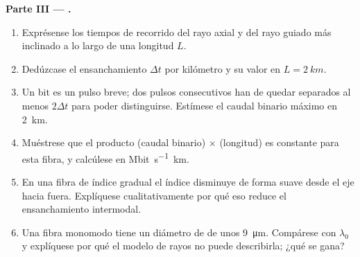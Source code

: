 \begin{problem}
\medskip
\noindent\textbf{Parte III --- .}
\begin{enumerate}[resume]
  \item Exprésense los tiempos de recorrido del rayo axial y del rayo
        guiado más inclinado a lo largo de una longitud $L$.
  \item Dedúzcase el ensanchamiento $\Delta t$ por kilómetro y su valor en
        $L = \qty{2}{km}$.
  \item Un bit es un pulso breve; dos pulsos consecutivos han de quedar
        separados al menos $2\Delta t$ para poder distinguirse. Estímese
        el caudal binario máximo en \qty{2}{km}.
  \item Muéstrese que el producto (caudal binario) $\times$ (longitud) es
        constante para esta fibra, y calcúlese en \unit{Mbit.s^{-1}.km}.
  \item En una fibra de índice gradual el índice disminuye de forma suave
        desde el eje hacia fuera. Explíquese cualitativamente por qué eso
        reduce el ensanchamiento intermodal.
  \item Una fibra monomodo tiene un diámetro de  de unos
        \qty{9}{\micro m}. Compárese con $\lambda_0$ y explíquese por qué
        el modelo de rayos no puede describirla; ¿qué se gana?
\end{enumerate}


\end{problem}

